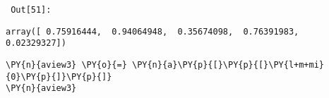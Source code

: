         {\par%
        \vspace{-1\smallerfontscale}%
        \noindent%
        \begin{minipage}{\cellleftmargin}%
    \hfill%
    {\smaller%
    \tt%
    \color{nbframe-out-prompt}%
    Out[51]:}%
    \hspace{\inputpadding}%
    \hspace{0em}%
    \hspace{3pt}%
    \end{minipage}%
        }%
    \begin{addmargin}[\cellleftmargin]{0em}%
    {\smaller%
    \vspace{-1\smallerfontscale}%
    
    
    
    \begin{verbatim}
array([ 0.75916444,  0.94064948,  0.35674098,  0.76391983,  0.02329327])
    \end{verbatim}

    
}%
    \end{addmargin}%

{\par%
\vspace{-1\baselineskip}%
}%
\begin{notebookcell}[52]%
\begin{addmargin}[\cellleftmargin]{0em}%
{\smaller%
\par%
%
\vspace{-1\smallerfontscale}%
\begin{Verbatim}[commandchars=\\\{\}]
\PY{n}{aview3} \PY{o}{=} \PY{n}{a}\PY{p}{[}\PY{p}{[}\PY{l+m+mi}{0}\PY{p}{]}\PY{p}{]}
\PY{n}{aview3}
\end{Verbatim}
%
\par%
\vspace{-1\smallerfontscale}}%
\end{addmargin}
\end{notebookcell}

\par\vspace{1\smallerfontscale}%
    
